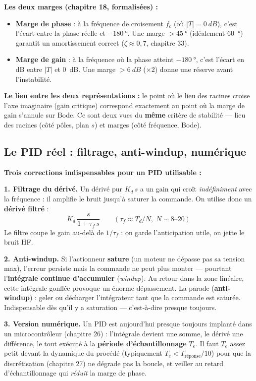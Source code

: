 \documentclass[12pt,a4paper,twoside]{book}
\begin{document}
\begin{formule}
\textbf{Les deux marges (chapitre 18, formalisées) :}
\begin{itemize}[nosep]
\item \textbf{Marge de phase} : à la fréquence de croisement $f_c$ (où $|T| = \SI{0}{dB}$), c'est l'écart entre la phase réelle et $-\SI{180}{°}$. Une marge $> \SI{45}{°}$ (idéalement \SI{60}{°}) garantit un amortissement correct ($\zeta \approx 0{,}7$, chapitre 33).
\item \textbf{Marge de gain} : à la fréquence où la phase atteint $-\SI{180}{°}$, c'est l'écart en dB entre $|T|$ et \SI{0}{dB}. Une marge $> \SI{6}{dB}$ ($\times 2$) donne une réserve avant l'instabilité.
\end{itemize}
\textbf{Le lien entre les deux représentations :} le point où le lieu des racines croise l'axe imaginaire (gain critique) correspond exactement au point où la marge de gain s'annule sur Bode. Ce sont deux vues du \textbf{même} critère de stabilité --- lieu des racines (côté pôles, plan $s$) et marges (côté fréquence, Bode).
\end{formule}

\subsection{Le PID réel : filtrage, anti-windup, numérique}

\begin{attention}
\textbf{Trois corrections indispensables pour un PID utilisable :}

\textbf{1. Filtrage du dérivé.} Un dérivé pur $K_d\,s$ a un gain qui croît \textit{indéfiniment} avec la fréquence : il amplifie le bruit jusqu'à saturer la commande. On utilise donc un \textbf{dérivé filtré} :
\[
K_d\,\frac{s}{1 + \tau_f\,s} \qquad (\tau_f \approx T_d/N,\; N \sim 8\text{--}20)
\]
Le filtre coupe le gain au-delà de $1/\tau_f$ : on garde l'anticipation utile, on jette le bruit HF.

\textbf{2. Anti-windup.} Si l'actionneur \textbf{sature} (un moteur ne dépasse pas sa tension max), l'erreur persiste mais la commande ne peut plus monter --- pourtant l'\textbf{intégrale continue d'accumuler} (\textit{windup}). Au retour dans la zone linéaire, cette intégrale gonflée provoque un énorme dépassement. La parade (\textbf{anti-windup}) : geler ou décharger l'intégrateur tant que la commande est saturée. Indispensable dès qu'il y a saturation --- c'est-à-dire presque toujours.

\textbf{3. Version numérique.} Un PID est aujourd'hui presque toujours implanté dans un microcontrôleur (chapitre 26) : l'intégrale devient une somme, le dérivé une différence, le tout exécuté à la \textbf{période d'échantillonnage} $T_e$. Il faut $T_e$ assez petit devant la dynamique du procédé (typiquement $T_e < T_{\text{réponse}}/10$) pour que la discrétisation (chapitre 27) ne dégrade pas la boucle, et veiller au retard d'échantillonnage qui \textit{réduit} la marge de phase.
\end{attention}
\end{document}
